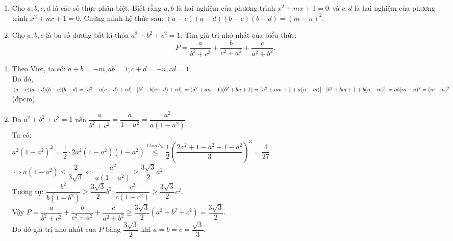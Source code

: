 \begin{ex}%
    \hfill
    \begin{enumerate}
    	\item Cho $a, b, c,d$ là các số thực phân biệt. Biết rằng $a, b$ là hai nghiệm của  phương \enskip trình  $x^2+mx+1=0$~và $c,d$ là hai nghiệm của phương trình $x^2+nx+1=0$. Chứng minh hệ thức sau: $(a-c)(a-d)(b-c)(b-d)=(m-n)^2$.
    	\item Cho $a,b,c$ là ba số dương bất kì thỏa $a^2+b^2+c^2=1$. Tìm giá trị nhỏ nhất của biểu thức: $$P=\dfrac{a}{b^2+c^2}+\dfrac{b}{c^2+a^2}+\dfrac{c}{a^2+b^2}.$$
    \end{enumerate}
\loigiai
    {
    \begin{enumerate}
        \item Theo Viet, ta có: $a+b=-m, ab=1; c+d=-n, cd=1$.\\
        Do đó,$(a-c)(a-d)(b-c)(b-d)=\left[a^2-a(c+d)+cd\right] \cdot \left[b^2-b(c+d)+cd\right] \\
        =(a^2+an+1)(b^2+bn+1)=\left[a^2+am+1+a(n-m)\right] \cdot \left[b^2+bm+1+b(n-m)\right]\\
        =ab(m-n)^2=(m-n)^2$ (đpcm).
        \item Do $a^2+b^2+c^2=1$ nên $\dfrac{a}{b^2+c^2}=\dfrac{a}{1-a^2}=\dfrac{a^2}{a(1-a^2)}$ .\\
        Ta có: \\$a^2(1-a^2)^2=\dfrac{1}{2} \cdot 2a^2(1-a^2)(1-a^2) \stackrel{Cauchy}{\leq} \dfrac{1}{2}\left( \dfrac{2a^2+1-a^2+1-a^2}{3}\right)^3=\dfrac{4}{27}$\\
        $\Leftrightarrow a(1-a^2) \leq \dfrac{2}{3\sqrt{3}} \Leftrightarrow \dfrac{a^2}{a(1-a^2)} \geq \dfrac{3\sqrt{3}}{2}a^2.$\\
        Tương tự: $\dfrac{b^2}{b(1-b^2)} \geq \dfrac{3\sqrt{3}}{2}b^2; \dfrac{c^2}{c(1-c^2)} \geq \dfrac{3\sqrt{3}}{2}c^2.$\\
        Vậy $P=\dfrac{a}{b^2+c^2}+\dfrac{b}{c^2+a^2}+\dfrac{c}{a^2+b^2} \geq \dfrac{3\sqrt{3}}{2}(a^2+b^2+c^2)=\dfrac{3\sqrt{3}}{2}.$\\
        Do đó giá trị nhỏ nhất của $P$ bằng $\dfrac{3\sqrt{3}}{2}$ khi $a=b=c=\dfrac{\sqrt{3}}{3}.$
    \end{enumerate}
    }
\end{ex}

